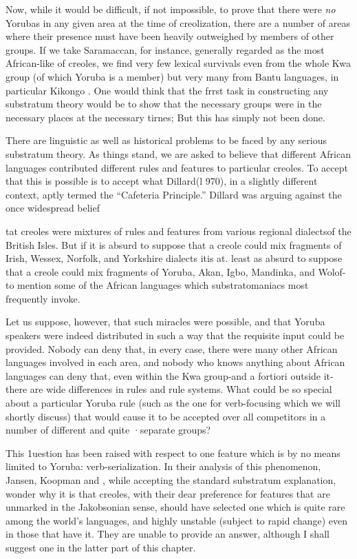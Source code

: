 Now, while it would be difficult, if not impossible, to prove that there were \textit{no} Yorubas in any given area at the time of creolization, there are a number of areas where their presence must have been heavily outweighed by members of other groups. If we take Sara\-maccan, for instance, generally regarded as the most African-like of creoles, we find very few lexical survivals even from the whole Kwa group (of which Yoruba is a member) but very many from Bantu lan\-guages, in particular Kikongo \citep{Daeleman1972}. One would think that the frrst task in constructing any substratum theory would be to show that the necessary groups were in the necessary places at the necessary tirnes; But this has simply not been done.

There are linguistic as well as historical problems to be faced by any serious substratum theory. As things stand, we are asked to believe that different African languages contributed different rules and features to particular creoles. To accept that this is possible is to accept what Dillard(l 970), in a slightly different context, aptly termed the ``Cafe\-teria Principle.'' Dillard was arguing against the once widespread belief

tat creoles were mixtures of rules and features from various regional dialectsof the British Isles. But if it is absurd to suppose that a creole could mix fragments of Irish, Wessex, Norfolk, and Yorkshire dialects itis at. least as absurd to suppose that a creole could mix fragments of  Yoruba, Akan, Igbo, Mandinka, and Wolof-to mention some of the African languages which substratomaniacs most frequently invoke.

Let us suppose, however, that such miracles were possible, and that Yoruba speakers were indeed distributed in such a way that the
requisite input could be provided. Nobody can deny that, in every case, there were many other African languages involved in each area, and nobody who knows anything about African languages can deny that, even within the Kwa group-and a fortiori outside it-there are wide differences in rules and rule systems. What could be so special about a particular Yoruba rule (such as the one for verb-focusing which we will shortly discuss) that would cause it to be accepted over all compe\-titors in a number of different and quite ·separate groups?

This 1uestion has been raised with respect to one feature which is by no means limited to Yoruba: verb-serialization. In their analysis of this phenomenon, Jansen, Koopman and \citet{Muysken1978}, while accepting the standard substratum explanation, wonder why it is that creoles, with their dear preference for features that are unmarked in the Jakobsonian sense, should have selected one which is quite rare among the world's languages, and highly unstable (subject to rapid change) even in those that have it. They are unable to provide an answer, although I shall suggest one in the latter part of this chapter.

